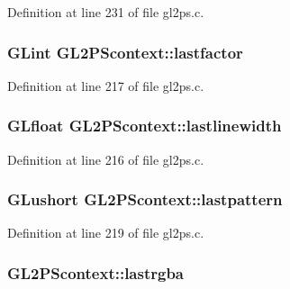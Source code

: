 Definition at line 231 of file gl2ps.\+c.

\hypertarget{struct_g_l2_p_scontext_a937de827c12eef3277d291071461c6ba}{}
\subsubsection[{lastfactor}]{\setlength{\rightskip}{0pt plus 5cm}G\+Lint G\+L2\+P\+Scontext\+::lastfactor}\label{struct_g_l2_p_scontext_a937de827c12eef3277d291071461c6ba}


Definition at line 217 of file gl2ps.\+c.

\hypertarget{struct_g_l2_p_scontext_aeacbba2cabb4cbb2dbeecd6b8eb2ae6b}{}
\subsubsection[{lastlinewidth}]{\setlength{\rightskip}{0pt plus 5cm}G\+Lfloat G\+L2\+P\+Scontext\+::lastlinewidth}\label{struct_g_l2_p_scontext_aeacbba2cabb4cbb2dbeecd6b8eb2ae6b}


Definition at line 216 of file gl2ps.\+c.

\hypertarget{struct_g_l2_p_scontext_a453e553f46eff8c9ca48b134f15d43bc}{}
\subsubsection[{lastpattern}]{\setlength{\rightskip}{0pt plus 5cm}G\+Lushort G\+L2\+P\+Scontext\+::lastpattern}\label{struct_g_l2_p_scontext_a453e553f46eff8c9ca48b134f15d43bc}


Definition at line 219 of file gl2ps.\+c.

\hypertarget{struct_g_l2_p_scontext_aa8a3f3056669e972e640fcc4b3b51138}{}
\subsubsection[{lastrgba}]{ G\+L2\+P\+Scontext\+::lastrgba}\label{struct_g_l2_p_scontext_aa8a3f3056669e972e640fcc4b3b51138}


